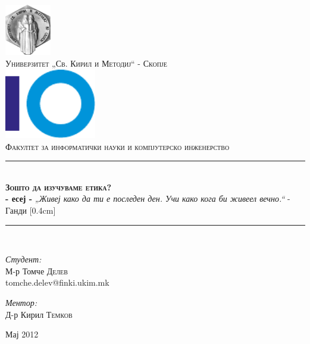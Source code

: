 \begin{titlepage}
\begin{center}
\newcommand{\HRule}{\rule{\linewidth}{0.5mm}}

\includegraphics[width=0.15\textwidth]{images/ukim}\\[1cm]
\textsc{\large Универзитет „Св. Кирил и Методиј“ - Скопје}\\[1.5cm]

\includegraphics[width=0.3\textwidth]{images/finki_logo}\\[1cm]
\textsc{\large Факултет за информатички науки и компјутерско
инженерство}\\[1.5cm]

\HRule \\[0.4cm]
{  \bfseries \textsc{Зошто да изучуваме етика?}\\[0.4cm] - есеј
-}
\vfill
\emph{„Живеј како да ти е последен ден. Учи како кога би живеел вечно.“} - Ганди
\vfill
[0.4cm]

\HRule \\[1.5cm]

\begin{minipage}{0.45\textwidth}
\begin{flushleft} 
\emph{Студент:}\\
М-р Томче \textsc{Делев}\\
tomche.delev@finki.ukim.mk
\end{flushleft}
\end{minipage}
\begin{minipage}{0.45\textwidth}
\begin{flushright} 
\emph{Ментор:} \\
Д-р Кирил \textsc{Темков}
\end{flushright}
\end{minipage}

\vfill

{\large Мај 2012}

\end{center}
\end{titlepage}
